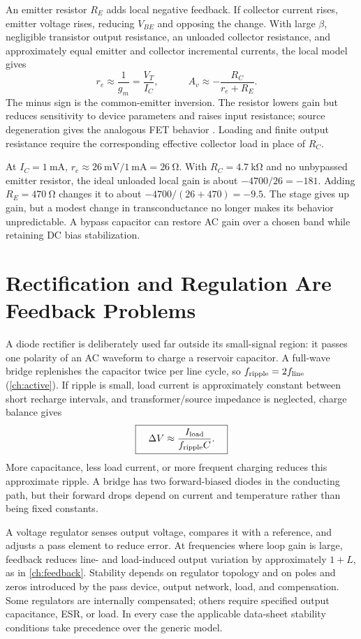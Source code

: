 An emitter resistor \(R_E\) adds local negative feedback. If collector current rises,
emitter voltage rises, reducing \(V_{BE}\) and opposing the change. With large
\(\beta\), negligible transistor output resistance, an unloaded collector resistance,
and approximately equal emitter and collector incremental currents, the local model gives
\[
 r_e\approx\frac{1}{g_m}=\frac{V_T}{I_C},
 \qquad
\boxed{\quad A_v\approx-\frac{R_C}{r_e+R_E}.\quad}
\]
The minus sign is the common-emitter inversion. The resistor lowers gain but reduces
sensitivity to device parameters and raises input resistance; source degeneration gives
the analogous FET behavior \cite[pp.~665--667]{nguyen2015rfic}. Loading and finite
output resistance require the corresponding effective collector load in place of
\(R_C\).

\begin{workedbox}
At \(I_C=\SI{1}{\milli\ampere}\), \(r_e\approx
\SI{26}{\milli\volt}/\SI{1}{\milli\ampere}=\SI{26}{\ohm}\).  With
\(R_C=\SI{4.7}{\kilo\ohm}\) and no unbypassed emitter resistor, the ideal unloaded local
gain is about \(-4700/26=-181\).  Adding \(R_E=\SI{470}{\ohm}\) changes it to
about \(-4700/(26+470)=-9.5\).  The stage gives up gain, but a modest change in
transconductance no longer makes its behavior unpredictable.  A bypass capacitor
can restore AC gain over a chosen band while retaining DC bias stabilization.
\end{workedbox}

\section{Rectification and Regulation Are Feedback Problems}
\label{sec:regulation}
A diode rectifier is deliberately used far outside its small-signal region: it
passes one polarity of an AC waveform to charge a reservoir capacitor. A full-wave
bridge replenishes the capacitor twice per line cycle, so
\(f_{\rm ripple}=2f_{\rm line}\) (\cref{ch:active}). If ripple is small, load current
is approximately constant between short recharge intervals, and transformer/source
impedance is neglected, charge balance gives
\[
\boxed{\quad\Delta V\approx\frac{I_{\rm load}}{f_{\rm ripple}C}.\quad}
\]
More capacitance, less load current, or more frequent charging reduces this approximate
ripple. A bridge has two forward-biased diodes in the conducting path, but their
forward drops depend on current and temperature rather than being fixed constants.

A voltage regulator senses output voltage, compares it with a reference, and adjusts
a pass element to reduce error. At frequencies where loop gain is large, feedback
reduces line- and load-induced output variation by approximately \(1+L\), as in
\cref{ch:feedback}. Stability depends on regulator topology and on poles and zeros
introduced by the pass device, output network, load, and compensation. Some regulators
are internally compensated; others require specified output capacitance, ESR, or load.
In every case the applicable data-sheet stability conditions take precedence over the
generic model.

